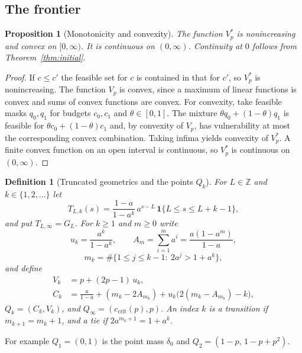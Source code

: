 \documentclass[conference]{IEEEtran}
\newtheorem{proposition}[theorem]{Proposition}
\newtheorem{definition}[theorem]{Definition}
\newcommand{\Z}{\mathbb{Z}}
\newcommand{\ccrit}{c_{\mathrm{crit}}}
\begin{document}
\subsection{The frontier}
\begin{proposition}[Monotonicity and convexity]\label{prop:convex}
The function \(V_p^*\) is nonincreasing and convex on \([0,\infty)\). It is continuous on \((0,\infty)\). Continuity at \(0\) follows from Theorem~\ref{thm:initial}.
\end{proposition}
\begin{proof}
If \(c\le c'\) the feasible set for \(c\) is contained in that for \(c'\), so \(V_p^*\) is nonincreasing. The function \(V_p\) is convex, since a maximum of linear functions is convex and sums of convex functions are convex. For convexity, take feasible masks \(q_0,q_1\) for budgets \(c_0,c_1\) and \(\theta\in[0,1]\). The mixture \(\theta q_0+(1-\theta)q_1\) is feasible for \(\theta c_0+(1-\theta)c_1\) and, by convexity of \(V_p\), has vulnerability at most the corresponding convex combination. Taking infima yields convexity of \(V_p^*\). A finite convex function on an open interval is continuous, so \(V_p^*\) is continuous on \((0,\infty)\).
\end{proof}

\begin{definition}[Truncated geometrics and the points \(Q_k\)]\label{def:Q}
For \(L\in\Z\) and \(k\in\{1,2,\dots\}\) let
\[
T_{L,k}(s)=\frac{1-a}{1-a^k}\,a^{s-L}\,\mathbf 1\{L\le s\le L+k-1\},
\]
and put \(T_{L,\infty}=G_L\). For \(k\ge1\) and \(m\ge0\) write
\[
u_k=\frac{a^k}{1-a^k},\qquad A_m=\sum_{i=1}^m a^i=\frac{a(1-a^m)}{1-a},
\]
\[
m_k=\#\{1\le j\le k-1:\ 2a^j>1+a^k\},
\]
and define
\begin{align*}
V_k&=p+(2p-1)\,u_k,\\
C_k&=\frac{a}{1-a}+(m_k-2A_{m_k})+u_k\bigl(2(m_k-A_{m_k})-k\bigr),
\end{align*}
\(Q_k=(C_k,V_k)\), and \(Q_\infty=(\ccrit(p),p)\). An index \(k\) is a \emph{transition} if \(m_{k+1}=m_k+1\), and a \emph{tie} if \(2a^{m_k+1}=1+a^k\).
\end{definition}

For example \(Q_1=(0,1)\) is the point mass \(\delta_0\) and \(Q_2=(1-p,\,1-p+p^2)\).
\end{document}
